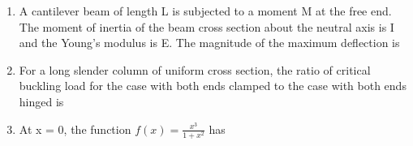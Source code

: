 \documentclass[journal,12pt,onecolumn]{IEEEtran}
\begin{document}
\begin{enumerate}
    \item A cantilever beam of length L is subjected to a moment M at the free end. The moment of inertia of the beam cross section about the neutral axis is I and the Young's modulus is E. The magnitude of the maximum deflection is

          \begin{enumerate}
          \end{enumerate}

    \item For a long slender column of uniform cross section, the ratio of critical buckling load for the case with both ends clamped to the case with both ends hinged is

          \begin{enumerate}
          \end{enumerate}

    \item At x = 0, the function \(f(x) = \frac{x^3}{1+x^2}\) has

          \begin{enumerate}
          \end{enumerate}


\end{enumerate}
\end{document}
